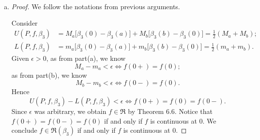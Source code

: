 \begin{Exercise}
\begin{enumerate}[(a)]
		\begin{itemize}
			\item \textbf{$\int f\,d\beta_2 = f(0)$ under the hypothesis.}
		\end{itemize}
		\begin{proof}
			By definition, we know
			$$
			L(P,f,\beta_2) \leq \int f\,d\beta_2 \leq U(P,f,\beta_2).
			$$
			We follow the notations from previous arguments.
			Thus we have
			\begin{align*}
			U(P,f,\beta_2) &= M_a \geq f(0); \\
			L(P,f,\beta_2) &= m_a \leq f(0).
			\end{align*}
			Given $\epsilon > 0$, it follows that
			\begin{align*}
			f(0)-\int f\,d\beta_2 \leq U(P,f,\beta_2) - L(P,f,\beta_2) < \epsilon; \\
			\int f\,d\beta_2-f(0) \leq U(P,f,\beta_2) - L(P,f,\beta_2) < \epsilon.
			\end{align*}
			Hence
			$$
			\left| \int f\,d\beta_2-f(0) \right| < \epsilon.
			$$
			Since $\epsilon$ was arbitrary, we conclude
			$$
			\int f\,d\beta_2 = f(0)
			$$
			as desired.
		\end{proof}
		
		\item
		\begin{proof}
			We follow the notations from previous arguments.
			
			Consider
			\begin{align*}
			U(P,f,\beta_3)
			&= M_a \big[ \beta_3(0) - \beta_3(a) \big] + M_b \big[ \beta_3(b) - \beta_3(0) \big]
			= \frac{1}{2}(M_a + M_b); \\
			L(P,f,\beta_3)
			&= m_a \big[ \beta_3(0) - \beta_3(a) \big] + m_b \big[ \beta_3(b) - \beta_3(0) \big]
			= \frac{1}{2}(m_a + m_b).
			\end{align*}
			Given $\epsilon > 0$, as from part(a), we know
			\begin{equation}
			M_a - m_a < \epsilon \iff f(0+) = f(0);\label{eq:ex_6.3c1}
			\end{equation}
			as from part(b), we know
			\begin{equation}
			M_b - m_b < \epsilon \iff f(0-) = f(0).\label{eq:ex_6.3c2}
			\end{equation}
			Hence
			$$
			U(P,f,\beta_3) - L(P,f,\beta_3) < \epsilon \iff f(0+) = f(0) = f(0-).
			$$
			Since $\epsilon$ was arbitrary, we obtain $f\in\mathfrak{R}$ by Theorem 6.6.
			Notice that $f(0+) = f(0-) = f(0)$ if and only if $f$ is continuous at $0$.
			We conclude $f\in\mathfrak{R}(\beta_3)$ if and only if $f$ is continuous at $0$.
		\end{proof}
		

\end{enumerate}
\end{Exercise}
